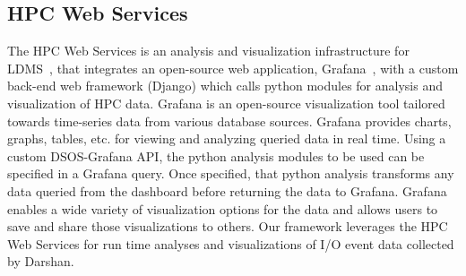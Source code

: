 \subsection{HPC Web Services}
The HPC Web Services is an analysis and visualization infrastructure for 
LDMS~\cite{ClusterAV}, that integrates an open-source web application, 
Grafana~\cite{grafana-website}, with a custom back-end web framework (Django)
which calls python modules for analysis and visualization of HPC data. Grafana 
is an open-source visualization tool tailored towards time-series data from 
various database sources. Grafana provides charts, graphs, tables, etc. for 
viewing and analyzing queried data in real time. Using a custom DSOS-Grafana API, 
the python analysis modules to be used can be specified in a Grafana query. 
Once specified, that python analysis transforms any data queried from the dashboard 
before returning the data to Grafana. Grafana enables a wide variety of visualization 
options for the data and allows users to save and share those visualizations to others. 
Our framework leverages the HPC Web Services for run time analyses and visualizations 
of I/O event data collected by Darshan.
